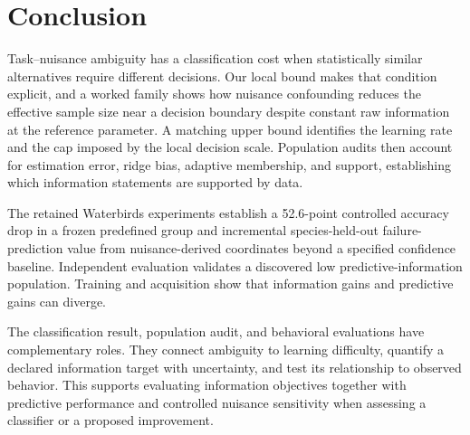 \section{Conclusion}
\label{sec:conclusion}

Task--nuisance ambiguity has a classification cost when statistically similar alternatives require different decisions. Our local bound makes that condition explicit, and a worked family shows how nuisance confounding reduces the effective sample size near a decision boundary despite constant raw information at the reference parameter. A matching upper bound identifies the learning rate and the cap imposed by the local decision scale. Population audits then account for estimation error, ridge bias, adaptive membership, and support, establishing which information statements are supported by data.

The retained Waterbirds experiments establish a 52.6-point controlled accuracy drop in a frozen predefined group and incremental species-held-out failure-prediction value from nuisance-derived coordinates beyond a specified confidence baseline. Independent evaluation validates a discovered low predictive-information population. Training and acquisition show that information gains and predictive gains can diverge.

The classification result, population audit, and behavioral evaluations have complementary roles. They connect ambiguity to learning difficulty, quantify a declared information target with uncertainty, and test its relationship to observed behavior. This supports evaluating information objectives together with predictive performance and controlled nuisance sensitivity when assessing a classifier or a proposed improvement.
